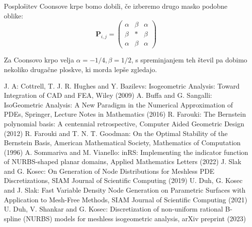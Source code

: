 \documentclass{article}
\begin{document}
Posplošitev Coonsove krpe bomo dobili, če izberemo drugo masko podobne oblike:
\begin{equation}
\textbf{P}_{i,j} = \begin{pmatrix} \alpha  & \beta & \alpha \\ \beta & * & \beta \\ \alpha & \beta & \alpha\end{pmatrix}
\end{equation}

Za Coonsovo krpo velja $\alpha = -1/4, \beta = 1/2$, s spreminjanjem teh števil pa dobimo nekoliko drugačne ploskve, ki morda lepše zgledajo. 


\begin{thebibliography}{3}

 J. A: Cottrell, T. J. R. Hughes and Y. Bazilevs: Isogeometric Analysis: Toward Integration of CAD and FEA, Wiley (2009)
 A. Buffa and G. Sangalli: IsoGeometric Analysis: A New Paradigm in the Numerical Approximation of PDEs, Springer, Lecture Notes in Mathematics (2016)
 R. Farouki: The Bernstein polynomial basis: A centennial retrospective, Computer Aided Geometric Design (2012)
 R. Farouki and T. N. T. Goodman: On the Optimal Stability of the Bernstein Basis, American Mathematical Society, Mathematics of Computation (1996)
 A. Sommariva and M. Vianello: inRS: Implementing the indicator function of NURBS-shaped planar domains, Applied Mathematics Letters (2022)
 J. Slak and G. Kosec: On Generation of Node Distributions for Meshless PDE Discretizations, SIAM Journal of Scientific Computing (2019)
 U. Duh, G. Kosec and J. Slak: Fast Variable Density Node Generation on Parametric Surfaces with Application to Mesh-Free Methods, SIAM Journal of Scientific Computing (2021)
 U. Duh, V. Shankar and G. Kosec: Discretization of non-uniform rational B-spline (NURBS) models for meshless isogeometric analysis, arXiv preprint (2023)
\end{thebibliography}
\end{document}
